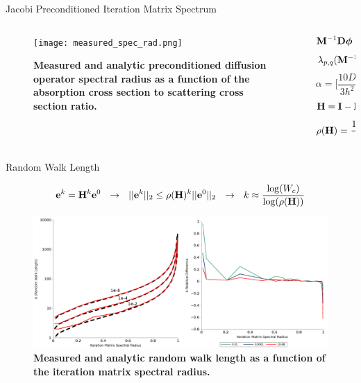 \documentclass{beamer}
\begin{document}
\begin{frame}{Jacobi Preconditioned Iteration Matrix Spectrum}

  \begin{columns}

    \begin{column}{0.5\textwidth}
      \begin{figure}[t!]
        \begin{center}
          \texttt{[image: measured\_spec\_rad.png]}
        \end{center}
        \caption{\textbf{Measured and analytic preconditioned diffusion
            operator spectral radius as a function of the absorption cross
            section to scattering cross section ratio.}}
      \end{figure}
    \end{column}

    \begin{column}{0.5\textwidth}
      \[
        \mathbf{M}^{-1} \mathbf{D} \boldsymbol{\phi} = \mathbf{M}^{-1} \mathbf{s}
      \]
      \medskip
      \[
        \lambda_{p,q}(\mathbf{M}^{-1} \mathbf{D}) = \alpha \lambda_{p,q}(\mathbf{D})
      \]
      \medskip
      \[
      \alpha = \Bigg[\frac{10 D}{3 h^2} + \Sigma_a\Bigg]^{-1}
      \]
      \medskip
      \[
        \mathbf{H} = \mathbf{I} - \mathbf{M}^{-1} \mathbf{D}
      \]
      \medskip
      \[
        \rho(\mathbf{H}) = \frac{10 \alpha D}{3 h^2}
      \]
    \end{column}

  \end{columns}

\end{frame}

\begin{frame}{Random Walk Length}

  \[
  \ve{e}^{k} = \ve{H}^k\ve{e}^0 \ \ \rightarrow \ \ ||\ve{e}^{k}||_2
  \leq \rho(\ve{H})^k ||\ve{e}^0||_2 \ \ \rightarrow \ \ k \approx
  \frac{ \log(W_c) }{ \log( \rho(\ve{H}) ) }
  \]

  \bigskip
  \begin{figure}[t!]
    \begin{center}
      \includegraphics[width=4.5in,clip]{measured_length_2.pdf}
    \end{center}
    \caption{\textbf{Measured and analytic random walk length as a
        function of the iteration matrix spectral radius.}}
  \end{figure}

\end{frame}
\end{document}
